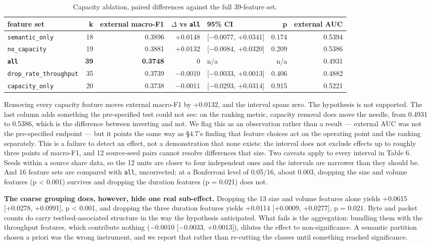\documentclass[preprint,12pt]{elsarticle}
\begin{document}
\begin{table}[htbp]\centering\scriptsize
\caption{Capacity ablation, paired differences against the full 39-feature set.}
\begin{adjustbox}{max width=\textwidth}\begin{tabular}{lrrrlrr}
\toprule
feature set & k & external macro-F1 & $\Delta$ vs \texttt{all} & 95\% CI & p & external AUC \\
\midrule
\texttt{semantic\_only} & 18 & 0.3896 & +0.0148 & [$-$0.0077, +0.0341] & 0.174 & 0.5394 \\
\texttt{no\_capacity} & 19 & 0.3881 & +0.0132 & [$-$0.0084, +0.0320] & 0.209 & 0.5386 \\
\textbf{\texttt{all}} & \textbf{39} & \textbf{0.3748} & 0 & n/a & n/a & 0.4931 \\
\texttt{drop\_rate\_throughput} & 35 & 0.3739 & $-$0.0010 & [$-$0.0033, +0.0013] & 0.406 & 0.4882 \\
\texttt{capacity\_only} & 20 & 0.3738 & $-$0.0011 & [$-$0.0293, +0.0314] & 0.915 & 0.5221 \\
\bottomrule
\end{tabular}\end{adjustbox}
\end{table}

Removing every capacity feature moves external macro-F1 by +0.0132, and the interval spans zero. The hypothesis is not supported. The last column adds something the pre-specified test could not see: on the ranking metric, capacity removal does move the needle, from 0.4931 to 0.5386, which is the difference between inverting and not. We flag this as an observation rather than a result --- external AUC was not the pre-specified endpoint --- but it points the same way as \S{}4.7's finding that feature choices act on the operating point and the ranking separately. This is a failure to detect an effect, not a demonstration that none exists: the interval does not exclude effects up to roughly three points of macro-F1, and 12 source-seed pairs cannot resolve differences that size. Two caveats apply to every interval in Table 6. Seeds within a source share data, so the 12 units are closer to four independent ones and the intervals are narrower than they should be. And 16 feature sets are compared with \texttt{all}, uncorrected; at a Bonferroni level of 0.05/16, about 0.003, dropping the size and volume features (p < 0.001) survives and dropping the duration features (p = 0.021) does not.

\textbf{The coarse grouping does, however, hide one real sub-effect.} Dropping the 13 size and volume features alone yields +0.0615 [+0.0278, +0.0991], p < 0.001, and dropping the three duration features yields +0.0114 [+0.0009, +0.0277], p = 0.021. Byte and packet counts do carry testbed-associated structure in the way the hypothesis anticipated. What fails is the aggregation: bundling them with the throughput features, which contribute nothing ($-$0.0010 [$-$0.0033, +0.0013]), dilutes the effect to non-significance. A semantic partition chosen a priori was the wrong instrument, and we report that rather than re-cutting the classes until something reached significance.
\end{document}
